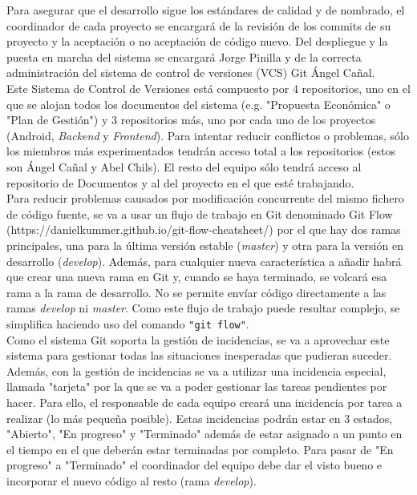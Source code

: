 \documentclass[12pt]{article}%
\begin{document}
Para asegurar que el desarrollo sigue los est\'andares de calidad y de nombrado, el coordinador de cada proyecto se encargar\'a de la revisi\'on de los commits de su proyecto y la aceptaci\'on o no aceptaci\'on de c\'odigo nuevo. Del despliegue y la puesta en marcha del sistema se encargar\'a Jorge Pinilla y de la correcta administraci\'on del sistema de control de versiones (VCS) Git \'Angel Ca\~nal.\\

Este Sistema de Control de Versiones est\'a compuesto por 4 repositorios, uno en el que se alojan todos los documentos del sistema (e.g. "Propuesta Econ\'omica" o "Plan de Gesti\'on") y 3 repositorios m\'as, uno por cada uno de los proyectos (Android, \textit{Backend} y \textit{Frontend}). Para intentar reducir conflictos o problemas, s\'olo los miembros m\'as experimentados tendr\'an acceso total a los repositorios (estos son \'Angel Ca\~nal y Abel Chils). El resto del equipo s\'olo tendr\'a acceso al repositorio de Documentos y al del proyecto en el que est\'e trabajando. \\

Para reducir problemas causados por modificaci\'on concurrente del mismo fichero de c\'odigo fuente, se va a usar un flujo de trabajo en Git denominado Git Flow (https://danielkummer.github.io/git-flow-cheatsheet/) por el que hay dos ramas principales, una para la \'ultima versi\'on estable (\textit{master}) y otra para la versi\'on en desarrollo (\textit{develop}). Adem\'as, para cualquier nueva caracter\'istica a a\~nadir habr\'a que crear una nueva rama en Git y, cuando se haya terminado, se volcar\'a esa rama a la rama de desarrollo. No se permite env\'iar c\'odigo directamente a las ramas \textit{develop} ni \textit{master}. Como este flujo de trabajo puede resultar complejo, se simplifica haciendo uso del comando \lstinline{"git flow"}.\\

Como el sistema Git soporta la gesti\'on de incidencias, se va a aprovechar este sistema para gestionar todas las situaciones inesperadas que pudieran suceder. Adem\'as, con la gesti\'on de incidencias se va a utilizar una incidencia especial, llamada "tarjeta" por la que se va a poder gestionar las tareas pendientes por hacer. Para ello, el responsable de cada equipo crear\'a una incidencia por tarea a realizar (lo m\'as peque\~na posible). Estas incidencias podr\'an estar en 3 estados, "Abierto", "En progreso" y "Terminado" adem\'as de estar asignado a un punto en el tiempo en el que deber\'an estar terminadas por completo. Para pasar de "En progreso" a "Terminado" el coordinador del equipo debe dar el visto bueno e incorporar el nuevo c\'odigo al resto (rama \textit{develop}).\\
\end{document}
